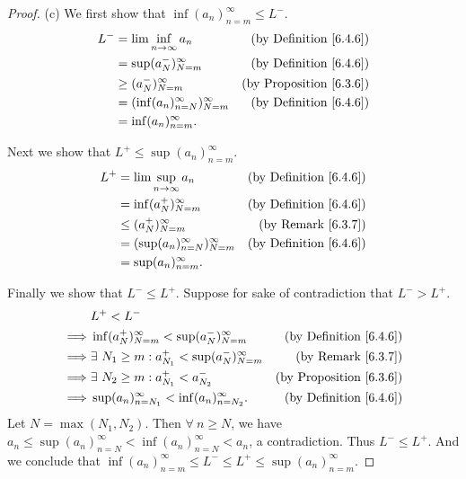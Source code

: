 \begin{proof}{(c)}
We first show that \(\inf(a_n)_{n = m}^\infty \leq L^-\).
\begin{align*}
L^- &= \lim\inf_{n \to \infty} a_n & \text{(by Definition \ref{6.4.6})} \\
&= \sup(a_N^-)_{N = m}^\infty & \text{(by Definition \ref{6.4.6})} \\
&\geq (a_N^-)_{N = m}^\infty & \text{(by Proposition \ref{6.3.6})} \\
&= (\inf(a_n)_{n = N}^\infty)_{N = m}^\infty & \text{(by Definition \ref{6.4.6})} \\
&= \inf(a_n)_{n = m}^\infty.
\end{align*}

Next we show that \(L^+ \leq \sup(a_n)_{n = m}^\infty\).
\begin{align*}
L^+ &= \lim\sup_{n \to \infty} a_n & \text{(by Definition \ref{6.4.6})} \\
&= \inf(a_N^+)_{N = m}^\infty & \text{(by Definition \ref{6.4.6})} \\
&\leq (a_N^+)_{N = m}^\infty & \text{(by Remark \ref{6.3.7})} \\
&= (\sup(a_n)_{n = N}^\infty)_{N = m}^\infty & \text{(by Definition \ref{6.4.6})} \\
&= \sup(a_n)_{n = m}^\infty.
\end{align*}

Finally we show that \(L^- \leq L^+\).
Suppose for sake of contradiction that \(L^- > L^+\).
\begin{align*}
& L^+ < L^- \\
\implies & \inf(a_N^+)_{N = m}^\infty < \sup(a_N^-)_{N = m}^\infty & \text{(by Definition \ref{6.4.6})} \\
\implies & \exists\ N_1 \geq m : a_{N_1}^+ < \sup(a_N^-)_{N = m}^\infty & \text{(by Remark \ref{6.3.7})} \\
\implies & \exists\ N_2 \geq m : a_{N_1}^+ < a_{N_2}^- & \text{(by Proposition \ref{6.3.6})} \\
\implies & \sup(a_n)_{n = N_1}^\infty < \inf(a_n)_{n = N_2}^\infty. & \text{(by Definition \ref{6.4.6})}
\end{align*}
Let \(N = \max(N_1, N_2)\).
Then \(\forall\ n \geq N\), we have \(a_n \leq \sup(a_n)_{n = N}^\infty < \inf(a_n)_{n = N}^\infty < a_n\), a contradiction.
Thus \(L^- \leq L^+\).
And we conclude that \(\inf(a_n)_{n = m}^\infty \leq L^- \leq L^+ \leq \sup(a_n)_{n = m}^\infty\).
\end{proof}

